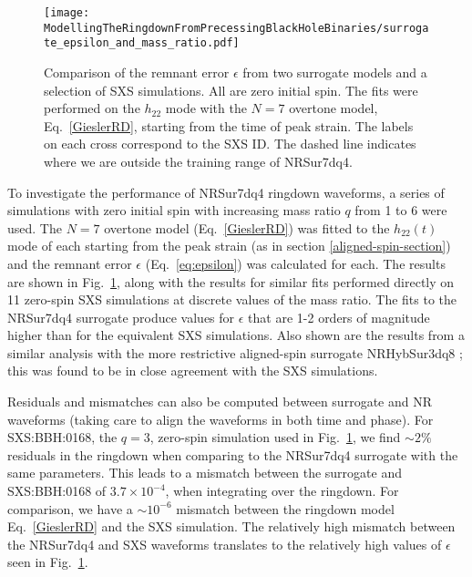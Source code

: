 \begin{figure}[b]
    \centering
    \texttt{[image: ModellingTheRingdownFromPrecessingBlackHoleBinaries/surrogate\_epsilon\_and\_mass\_ratio.pdf]}
    \caption[Comparison of the error on measured remnant mass and spin from two surrogate models and a selection of SXS simulations.]{
    Comparison of the remnant error $\epsilon$ from two surrogate models and a selection of SXS simulations. All are zero initial spin. The fits were performed on the $h_{22}$ mode with the $N=7$ overtone model, Eq.~\ref{GieslerRD}, starting from the time of peak strain. The labels on each cross correspond to the SXS ID. The dashed line indicates where we are outside the training range of NRSur7dq4.
    }
    \label{surrogate_epsilon_vs_q}
\end{figure} 

To investigate the performance of NRSur7dq4 ringdown waveforms, a series of simulations with zero initial spin with increasing mass ratio $q$ from 1 to 6 were used. 
The $N=7$ overtone model (Eq.~\ref{GieslerRD}) was fitted to the $h_{22}(t)$ mode of each starting from the peak strain (as in section \ref{aligned-spin-section})
and the remnant error $\epsilon$ (Eq.~\ref{eq:epsilon}) was calculated for each.
The results are shown in Fig.~\ref{surrogate_epsilon_vs_q}, along with the results for similar fits performed directly on 11 zero-spin SXS simulations at discrete values of the mass ratio. 
The fits to the NRSur7dq4 surrogate produce values for $\epsilon$ that are 1-2 orders of magnitude higher than for the equivalent SXS simulations. 
Also shown are the results from a similar analysis with the more restrictive aligned-spin surrogate NRHybSur3dq8 \cite{Varma:2018mmi}; this was found to be in close agreement with the SXS simulations.

Residuals and mismatches can also be computed between surrogate and NR waveforms (taking care to align the waveforms in both time and phase).
For SXS:BBH:0168, the $q=3$, zero-spin simulation used in Fig.~\ref{surrogate_epsilon_vs_q}, we find $\sim 2\%$ residuals in the ringdown when comparing to the NRSur7dq4 surrogate with the same parameters. 
This leads to a mismatch between the surrogate and SXS:BBH:0168 of $3.7 \times 10^{-4}$, when integrating over the ringdown. For comparison, we have a $\sim 10^{-6}$ mismatch between the ringdown model Eq.~\eqref{GieslerRD} and the SXS simulation. The relatively high mismatch between the NRSur7dq4 and SXS waveforms translates to the relatively high values of $\epsilon$ seen in Fig.~\ref{surrogate_epsilon_vs_q}. 

